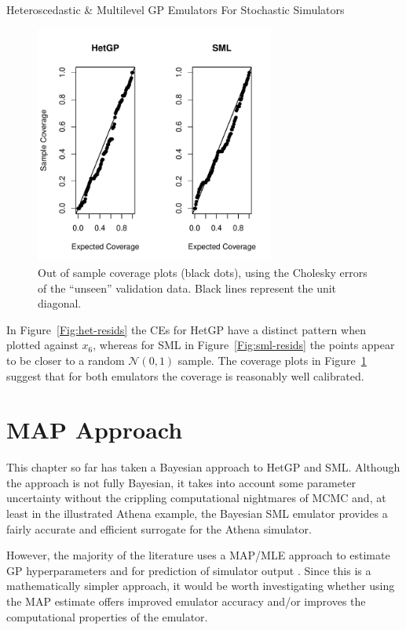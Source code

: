 \begin{chapter}{Heteroscedastic \& Multilevel GP Emulators For Stochastic Simulators\label{Ch:Hetsml}}
\begin{figure}[!ht]
\end{figure}
\begin{figure}[!ht]
    \centering
\includegraphics[width = 0.7\textwidth]{sml-het-fig2/coverage-new3.pdf}
    \caption{Out of sample coverage plots (black dots), using the Cholesky errors of the ``unseen'' validation data. Black lines represent the unit diagonal. \label{Fig:coverage}}
\end{figure}
In Figure~\ref{Fig:het-resids} the CEs for HetGP have a distinct pattern when plotted against $x_6$, whereas for SML in Figure~\ref{Fig:sml-resids} the points appear to be closer to a random $\mathcal{N}(0,1)$ sample.  The coverage plots in Figure~\ref{Fig:coverage} suggest that for both emulators the coverage is reasonably well calibrated.

\section{MAP Approach}

This chapter so far has taken a Bayesian approach to HetGP and SML. Although the approach is not fully Bayesian, it takes into account some parameter uncertainty without the crippling computational nightmares of MCMC and, at least in the illustrated Athena example, the Bayesian SML emulator provides a fairly accurate and efficient surrogate for the Athena simulator.

However, the majority of the literature uses a MAP/MLE approach to estimate GP hyperparameters and for prediction of simulator output \citep{Binois2018, Baker2020a, Baker2020c, Zhang2020, Baker2022}. Since this is a mathematically simpler approach, it would be worth investigating whether using the MAP estimate offers improved emulator accuracy and/or improves the computational properties of the emulator.



\end{chapter}
